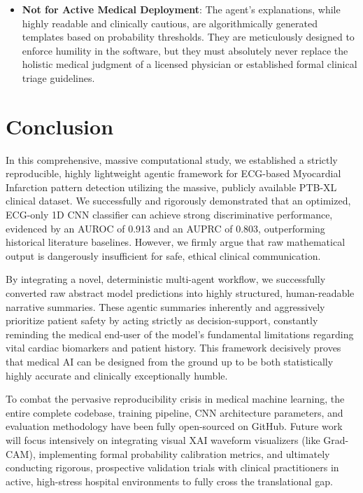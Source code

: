 \documentclass[10pt,twocolumn,letterpaper]{article}
\begin{document}
\begin{itemize}
    \item \textbf{Not for Active Medical Deployment}: The agent's explanations, while highly readable and clinically cautious, are algorithmically generated templates based on probability thresholds. They are meticulously designed to enforce humility in the software, but they must absolutely never replace the holistic medical judgment of a licensed physician or established formal clinical triage guidelines.
\end{itemize}

\section{Conclusion}

In this comprehensive, massive computational study, we established a strictly reproducible, highly lightweight agentic framework for ECG-based Myocardial Infarction pattern detection utilizing the massive, publicly available PTB-XL clinical dataset. We successfully and rigorously demonstrated that an optimized, ECG-only 1D CNN classifier can achieve strong discriminative performance, evidenced by an AUROC of 0.913 and an AUPRC of 0.803, outperforming historical literature baselines. However, we firmly argue that raw mathematical output is dangerously insufficient for safe, ethical clinical communication. 

By integrating a novel, deterministic multi-agent workflow, we successfully converted raw abstract model predictions into highly structured, human-readable narrative summaries. These agentic summaries inherently and aggressively prioritize patient safety by acting strictly as decision-support, constantly reminding the medical end-user of the model's fundamental limitations regarding vital cardiac biomarkers and patient history. This framework decisively proves that medical AI can be designed from the ground up to be both statistically highly accurate and clinically exceptionally humble. 

To combat the pervasive reproducibility crisis in medical machine learning, the entire complete codebase, training pipeline, CNN architecture parameters, and evaluation methodology have been fully open-sourced on GitHub. Future work will focus intensively on integrating visual XAI waveform visualizers (like Grad-CAM), implementing formal probability calibration metrics, and ultimately conducting rigorous, prospective validation trials with clinical practitioners in active, high-stress hospital environments to fully cross the translational gap.



\end{document}
